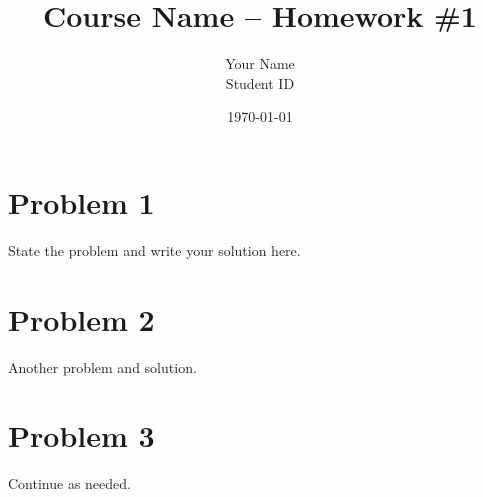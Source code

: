 \documentclass[12pt]{article}
\title{Course Name -- Homework \#1}
\author{Your Name \\ Student ID}
\date{\today}
\begin{document}
\maketitle

\section*{Problem 1}
State the problem and write your solution here.

\section*{Problem 2}
Another problem and solution.

\section*{Problem 3}
Continue as needed.
\end{document}
